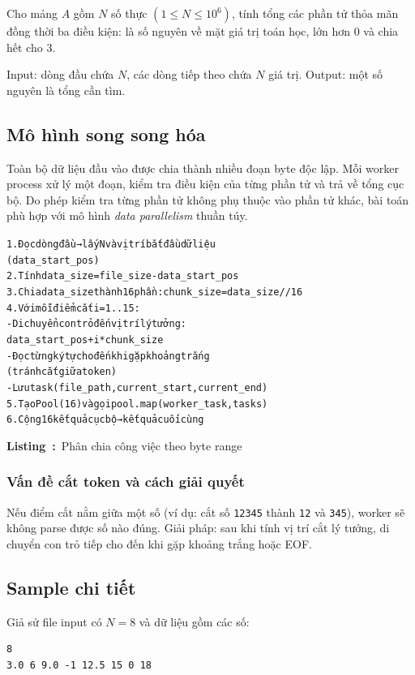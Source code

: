 \documentclass[12pt,a4paper]{article}
\newcounter{vietlisting}
\newenvironment{vietlisting}[1]{%
  \def\vietlistingcaption{#1}%
  \refstepcounter{vietlisting}%
  \begin{tcolorbox}[
    enhanced,
    breakable,
    colback=codebg,
    colframe=codeframe,
    boxrule=0.5pt,
    arc=1mm,
    left=6pt,
    right=6pt,
    top=6pt,
    bottom=4pt
  ]%
  \small\ttfamily\begin{alltt}
}{%
  \end{alltt}\normalfont
  \end{tcolorbox}%
  \begin{center}
    \small\textbf{Listing~\thevietlisting:}~\vietlistingcaption
  \end{center}
}
\begin{document}
Cho mảng $A$ gồm $N$ số thực $(1 \leq N \leq 10^6)$, tính tổng các phần tử thỏa mãn đồng thời ba điều kiện: là số nguyên về mặt giá trị toán học, lớn hơn 0 và chia hết cho 3.

Input: dòng đầu chứa $N$, các dòng tiếp theo chứa $N$ giá trị. Output: một số nguyên là tổng cần tìm.

\subsection{Mô hình song song hóa}

Toàn bộ dữ liệu đầu vào được chia thành nhiều đoạn byte độc lập. Mỗi worker process xử lý một đoạn, kiểm tra điều kiện của từng phần tử và trả về tổng cục bộ. Do phép kiểm tra từng phần tử không phụ thuộc vào phần tử khác, bài toán phù hợp với mô hình \textit{data parallelism} thuần túy.

\begin{vietlisting}{Phân chia công việc theo byte range}
1. Đọc dòng đầu → lấy N và vị trí bắt đầu dữ liệu 
(data_start_pos)
2. Tính data_size = file_size - data_start_pos
3. Chia data_size thành 16 phần: chunk_size = data_size // 16
4. Với mỗi điểm cắt i = 1..15:
   - Di chuyển con trỏ đến vị trí lý tưởng: 
   data_start_pos + i * chunk_size
   - Đọc từng ký tự cho đến khi gặp khoảng trắng 
   (tránh cắt giữa token)
   - Lưu task (file_path, current_start, current_end)
5. Tạo Pool(16) và gọi pool.map(worker_task, tasks)
6. Cộng 16 kết quả cục bộ → kết quả cuối cùng
\end{vietlisting}

\subsubsection{Vấn đề cắt token và cách giải quyết}

Nếu điểm cắt nằm giữa một số (ví dụ: cắt số \texttt{12345} thành \texttt{12} và \texttt{345}), worker sẽ không parse được số nào đúng. Giải pháp: sau khi tính vị trí cắt lý tưởng, di chuyển con trỏ tiếp cho đến khi gặp khoảng trắng hoặc EOF.

\subsection{Sample chi tiết}

Giả sử file input có $N=8$ và dữ liệu gồm các số:
\begin{verbatim}
8
3.0 6 9.0 -1 12.5 15 0 18
\end{verbatim}
\end{document}
